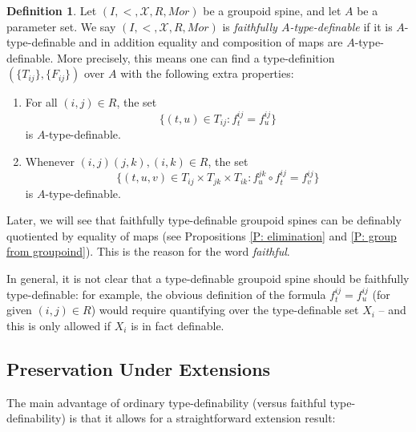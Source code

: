 \documentclass{amsart}
\theoremstyle{definition}
\newtheorem{definition}[theorem]{Definition}
\begin{document}
    \begin{definition}
        Let $(I,<,\mathcal X,R,Mor)$ be a groupoid spine, and let $A$ be a parameter set. We say $(I,<,\mathcal X,R,Mor)$ is \textit{faithfully $A$-type-definable} if it is $A$-type-definable and in addition equality and composition of maps are $A$-type-definable. More precisely, this means one can find a type-definition $(\{T_{ij}\},\{F_{ij}\})$ over $A$ with the following extra properties:
        \begin{enumerate}
            \item For all $(i,j)\in R$, the set $$\{(t,u)\in T_{ij}:f_t^{ij}=f_u^{ij}\}$$ is $A$-type-definable.
            \item Whenever $(i,j)(j,k),(i,k)\in R$, the set $$\{(t,u,v)\in T_{ij}\times T_{jk}\times T_{ik}:f_u^{jk}\circ f_t^{ij}=f_v^{ij}\}$$ is $A$-type-definable.
        \end{enumerate}
    \end{definition}

    Later, we will see that faithfully type-definable groupoid spines can be definably quotiented by equality of maps (see Propositions \ref{P: elimination} and \ref{P: group from groupoind}). This is the reason for the word \textit{faithful}.  

In general, it is not clear that a type-definable groupoid spine should be faithfully type-definable: for example, the obvious definition of the formula $f^{ij}_t=f^{ij}_u$ (for given $(i,j)\in R$) would require quantifying over the type-definable set $X_i$ -- and this is only allowed if $X_i$ is in fact definable.

\subsection{Preservation Under Extensions}

The main advantage of ordinary type-definability (versus faithful type-definability) is that it allows for a straightforward extension result:
\end{document}

